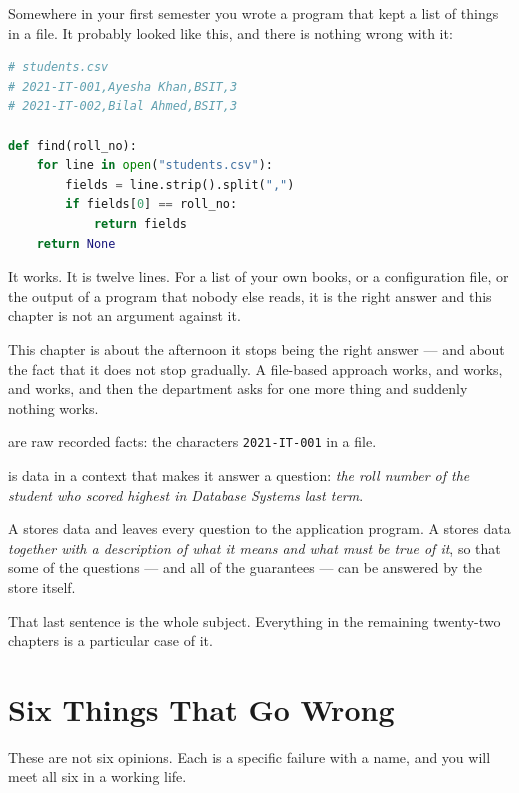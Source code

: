 Somewhere in your first semester you wrote a program that kept a list of
things in a file. It probably looked like this, and there is nothing wrong
with it:

\begin{lstlisting}[language=python]
# students.csv
# 2021-IT-001,Ayesha Khan,BSIT,3
# 2021-IT-002,Bilal Ahmed,BSIT,3

def find(roll_no):
    for line in open("students.csv"):
        fields = line.strip().split(",")
        if fields[0] == roll_no:
            return fields
    return None
\end{lstlisting}

It works. It is twelve lines. For a list of your own books, or a configuration
file, or the output of a program that nobody else reads, it is the right
answer and this chapter is not an argument against it.

This chapter is about the afternoon it stops being the right answer --- and
about the fact that it does not stop gradually. A file-based approach works,
and works, and works, and then the department asks for one more thing and
suddenly nothing works.

\begin{definitionbox}
 are raw recorded facts: the characters \texttt{2021-IT-001} in a
file.

\smallskip
{} is data in a context that makes it answer a question:
\emph{the roll number of the student who scored highest in Database Systems
last term}.

\smallskip
A  stores data and leaves every question to the
application program. A  stores data \emph{together with a
description of what it means and what must be true of it}, so that some of the
questions --- and all of the guarantees --- can be answered by the store
itself.

\smallskip
That last sentence is the whole subject. Everything in the remaining
twenty-two chapters is a particular case of it.
\end{definitionbox}

\section{Six Things That Go Wrong}

These are not six opinions. Each is a specific failure with a name, and you
will meet all six in a working life.

